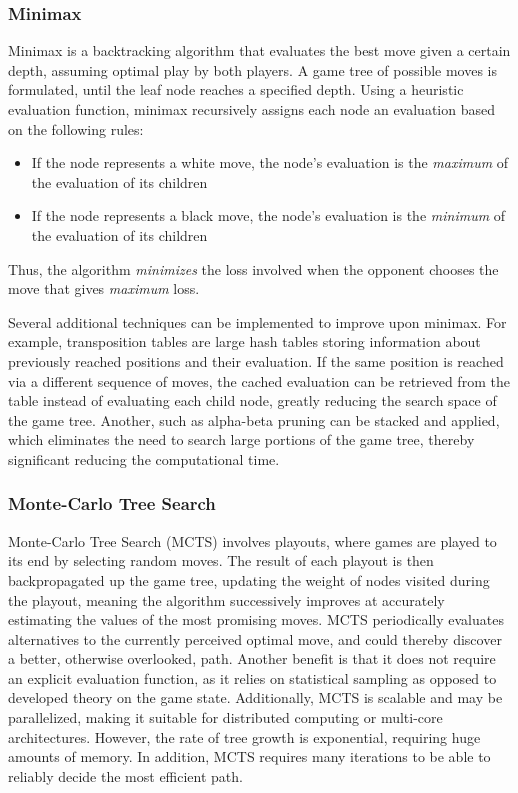 \documentclass[../main/main.tex]{subfiles}
\begin{document}
\subsubsection*{Minimax}
Minimax is a backtracking algorithm that evaluates the best move given a certain depth, assuming optimal play by both players. A game tree of possible moves is formulated, until the leaf node reaches a specified depth. Using a heuristic evaluation function, minimax recursively assigns each node an evaluation based on the following rules:

\begin{itemize}
\item If the node represents a white move, the node’s evaluation is the \textit{maximum} of the evaluation of its children
\item If the node represents a black move, the node’s evaluation is the \textit{minimum} of the evaluation of its children
\end{itemize}

Thus, the algorithm \textit{minimizes} the loss involved when the opponent chooses the move that gives \textit{maximum} loss.

Several additional techniques can be implemented to improve upon minimax. For example, transposition tables are large hash tables storing information about previously reached positions and their evaluation. If the same position is reached via a different sequence of moves, the cached evaluation can be retrieved from the table instead of evaluating each child node, greatly reducing the search space of the game tree. Another, such as alpha-beta pruning can be stacked and applied, which eliminates the need to search large portions of the game tree, thereby significant reducing the computational time.

\subsubsection*{Monte-Carlo Tree Search}
Monte-Carlo Tree Search (MCTS) involves playouts, where games are played to its end by selecting random moves. The result of each playout is then backpropagated up the game tree, updating the weight of nodes visited during the playout, meaning the algorithm successively improves at accurately estimating the values of the most promising moves. MCTS periodically evaluates alternatives to the currently perceived optimal move, and could thereby discover a better, otherwise overlooked, path. Another benefit is that it does not require an explicit evaluation function, as it relies on statistical sampling as opposed to developed theory on the game state. Additionally, MCTS is scalable and may be parallelized, making it suitable for distributed computing or multi-core architectures. However, the rate of tree growth is exponential, requiring huge amounts of memory. In addition, MCTS requires many iterations to be able to reliably decide the most efficient path.
\end{document}
